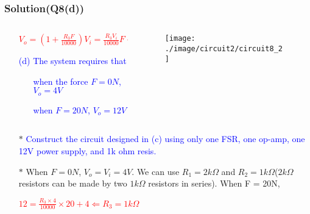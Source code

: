 \documentclass{beamer}
\newcommand{\blue}[1]{\textcolor{blue}{#1}}
\newcommand{\red}[1]{\textcolor{red}{#1}}
\begin{document}
\begin{frame}
\frametitle{Solution(Q8(d))}

\begin{columns}
\begin{column}{8cm}


\begin{itemize} \itemsep1pt \parskip0pt 
  \item[] \red{$V_o = (1 + \frac{R_3F}{10000})V_i = \frac{R_3V_i}{10000}F + V_i$}
  \vspace{8 mm}
  \item[] \blue{(d) The system requires that}
  \begin{itemize} \itemsep1pt \parskip0pt 
  \item[] \blue{when the force $F = 0N$, $V_o = 4V$}
  \item[] \blue{when $F = 20N$, $V_o = 12V$}
  \end{itemize}
\end{itemize}
\end{column}


\begin{column}{4cm}
\begin{figure}[H]
  \centering
  \texttt{[image: ./image/circuit2/circuit8\_2]}
\end{figure}
\end{column}
\end{columns}



\begin{itemize} \itemsep1pt \parskip0pt 
  \item[$\ast$] \blue{Construct the circuit designed in (c) using only one FSR, one op-amp, one 12V power supply, and 1k ohm resis.}
  \item[$\ast$] When $F = 0N$, $V_o = V_i = 4V$. We can use $R_1 = 2k\Omega$ and $R_2 = 1k\Omega$($2k\Omega$ resistors can be made by two $1k\Omega$ resistors in series). When F = 20N,
  \item[] \hspace{25 mm}\red{$12 = \frac{R_3 \times 4}{10000} \times 20 + 4 \Leftarrow R_3 = 1k\Omega$}
\end{itemize}



\end{frame}

\end{document}
